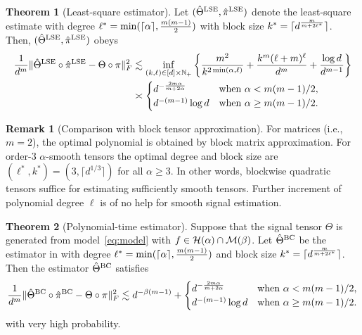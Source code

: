 \documentclass[11pt]{article}
\theoremstyle{definition}
\newtheorem{thm}{Theorem}
\newtheorem{rmk}{Remark}
\begin{document}
\begin{thm}[Least-square estimator]\label{thm:3} Let $(\hat \Theta^\textup{LSE}, \hat \pi^\textup{LSE})$ denote the least-square estimate with degree $\ell^*= \min(\lceil \alpha \rceil, {m(m-1)\over 2})$ with block size $k^*=\lceil  d^{m\over m+2\ell^*} \rceil $. Then, $(\hat \Theta^\textup{LSE}, \hat \pi^\textup{LSE})$ obeys
\begin{equation}
\begin{aligned}
{1\over d^m}\lVert\hat \Theta^\textup{LSE}\circ \hat \pi^\textup{LSE} -\Theta\circ \pi\rVert_F^2&\lesssim 
\inf_{(k,\ell)\in[d]\times \mathbb{N}_{+}}\left\{{m^2\over k^{2\min(\alpha,\ell)}}+{k^m(\ell+m)^\ell \over d^{m}}+{\log d\over d^{m-1}}\right\}\notag \\
&\asymp
\begin{cases}
d^{-{2m\alpha \over m+2\alpha}} & \text{when }\alpha<m(m-1)/2,\\
 d^{-(m-1)}\log d & \text{when }\alpha\geq m(m-1)/2.\\
\end{cases}
\end{aligned}
\end{equation}
\end{thm}
\begin{rmk}[Comparison with block tensor approximation] 
For matrices (i.e., $m=2$), the optimal polynomial is obtained by block matrix approximation. For order-3 $\alpha$-smooth tensors the optimal degree and block size are $(\ell^*, k^*)=(3,\lceil  d^{1/3}\rceil  )$ for all $\alpha\geq 3$. In other words, blockwise quadratic tensors suffice for estimating sufficiently smooth tensors. Further increment of polynomial degree $\ell$ is of no help for smooth signal estimation. 
\end{rmk}


\begin{thm}[Polynomial-time estimator] Suppose that the signal tensor $\Theta$ is generated from model~\eqref{eq:model} with $f\in \mathcal{H}(\alpha)\cap \mathcal{M}(\beta)$. Let $\hat \Theta^\textup{BC}$ be the estimator in with degree $\ell^*= \min(\lceil \alpha\rceil, {m(m-1)\over 2})$ and block size $k^*=\lceil d^{m\over m+2\ell^*}\rceil$. Then the estimator $\hat \Theta^\textup{BC} $ satisfies
\[
{1\over d^m}\lVert\hat \Theta^\textup{BC}\circ \hat \pi^\textup{BC} -\Theta\circ \pi\rVert_F^2\lesssim d^{-\beta(m-1)}+
\begin{cases}
d^{-{2m\alpha \over m+2\alpha}} & \text{when }\alpha < m(m-1)/2,\\
 d^{-(m-1)}\log d & \text{when }\alpha \geq m(m-1)/2.\\
\end{cases}
\]
with very high probability. 
\end{thm}
\end{document}
